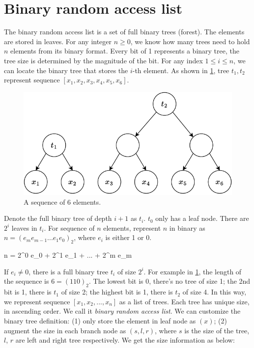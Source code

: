 \documentclass[b5paper]{article}
\begin{document}
\section{Binary random access list}

The binary random access list is a set of full binary trees (forest). The elements are stored in leaves. For any integer $n \geq 0$, we know how many trees need to hold $n$ elements from its binary format. Every bit of 1 represents a binary tree, the tree size is determined by the magnitude of the bit. For any index $1 \leq i \leq n$, we can locate the binary tree that stores the $i$-th element. As shown in \cref{fig:bi-tree-sequence}, tree $t_1, t_2$ represent sequence $[x_1, x_2, x_3, x_4, x_5, x_6]$.

\begin{figure}[htbp]
  \centering
  \includegraphics[scale=0.5]{img/bi-tree-sequence}
  \caption{A sequence of 6 elements.}
  \label{fig:bi-tree-sequence}
\end{figure}

Denote the full binary tree of depth $i + 1$ as $t_i$. $t_0$ only has a leaf node. There are $2^i$ leaves in $t_i$. For sequence of $n$ elements, represent $n$ in binary as $n = (e_m e_{m-1} ... e_1 e_0)_2$, where $e_i$ is either 1 or 0.

\be
n = 2^0 e_0 + 2^1 e_1 + ... + 2^m e_m
\ee

If $e_i \neq 0$, there is a full binary tree $t_i$ of size $2^i$. For example in \cref{fig:bi-tree-sequence}, the length of the sequence is $6 = (110)_2$. The lowest bit is 0, there's no tree of size 1; the 2nd bit is 1, there is $t_1$ of size 2; the highest bit is 1, there is $t_2$ of size 4. In this way, we represent sequence $[x_1, x_2, ..., x_n]$ as a list of trees. Each tree has unique size, in ascending order. We call it {\em binary random access list}\cite{okasaki-book}. We can customize the binary tree definition: (1) only store the element in leaf node as $(x)$; (2) augment the size in each branch node as $(s, l, r)$, where $s$ is the size of the tree, $l$, $r$ are left and right tree respectively. We get the size information as below:
\end{document}
